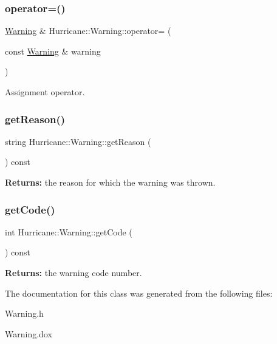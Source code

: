 \subsubsection{\texorpdfstring{operator=()}{operator=()}}
{\footnotesize\ttfamily \hyperlink{classHurricane_1_1Warning}{Warning} \& Hurricane\+::\+Warning\+::operator= (\begin{DoxyParamCaption}\item[{const \hyperlink{classHurricane_1_1Warning}{Warning} \&}]{warning }\end{DoxyParamCaption})}

Assignment operator. \mbox{\label{classHurricane_1_1Warning_afe26e9c4e0801d112d743d8afe8c3ac3}} 
\subsubsection{\texorpdfstring{get\+Reason()}{getReason()}}
{\footnotesize\ttfamily string Hurricane\+::\+Warning\+::get\+Reason (\begin{DoxyParamCaption}{ }\end{DoxyParamCaption}) const\hspace{0.3cm}{\ttfamily [inline]}}

{\bfseries Returns\+:} the reason for which the warning was thrown. \mbox{\label{classHurricane_1_1Warning_a28350d25d1691b754fd8d79d1539234c}} 
\subsubsection{\texorpdfstring{get\+Code()}{getCode()}}
{\footnotesize\ttfamily int Hurricane\+::\+Warning\+::get\+Code (\begin{DoxyParamCaption}{ }\end{DoxyParamCaption}) const\hspace{0.3cm}{\ttfamily [inline]}}

{\bfseries Returns\+:} the warning code number. 

The documentation for this class was generated from the following files\+:\begin{DoxyCompactItemize}
\item 
Warning.\+h\item 
Warning.\+dox\end{DoxyCompactItemize}
